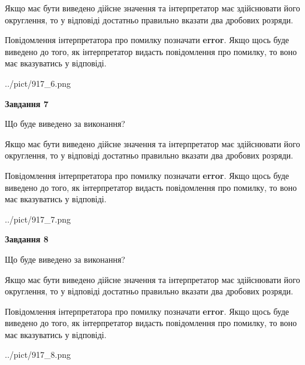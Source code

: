\documentclass[12pt, ukrainian]{article}
\begin{document}
{\begin {Large}
Якщо має бути виведено дійсне значення та інтерпретатор має здійснювати його округлення, 
то у відповіді достатньо правильно вказати два дробових розряди.

Повідомлення інтерпретатора про помилку позначати \textbf{error}.
Якщо щось буде виведено до того, як інтерпретатор видасть повідомлення про помилку, 
то воно має вказуватись у відповіді. \par

\begin{center}
	{../pict/917_6.png}
\end{center}
\newpage

{\begin {center}\textbf{Завдання 7}\end {center}}\par
Що буде виведено за виконання? \par

Якщо має бути виведено дійсне значення та інтерпретатор має здійснювати його округлення, 
то у відповіді достатньо правильно вказати два дробових розряди.

Повідомлення інтерпретатора про помилку позначати \textbf{error}.
Якщо щось буде виведено до того, як інтерпретатор видасть повідомлення про помилку, 
то воно має вказуватись у відповіді. \par

\begin{center}
	{../pict/917_7.png}
\end{center}
\newpage

{\begin {center}\textbf{Завдання 8}\end {center}}\par
Що буде виведено за виконання? \par

Якщо має бути виведено дійсне значення та інтерпретатор має здійснювати його округлення, 
то у відповіді достатньо правильно вказати два дробових розряди.

Повідомлення інтерпретатора про помилку позначати \textbf{error}.
Якщо щось буде виведено до того, як інтерпретатор видасть повідомлення про помилку, 
то воно має вказуватись у відповіді. \par

\begin{center}
	{../pict/917_8.png}
\end{center}
\newpage


\end{Large}}
\end{document}
